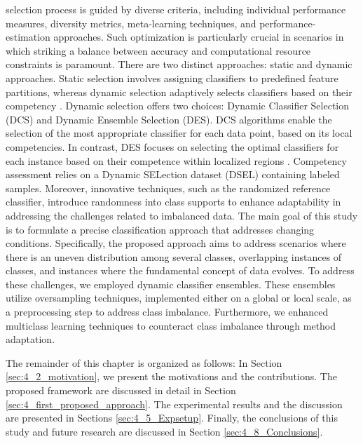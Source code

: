   selection process is guided by diverse criteria, including individual performance measures, diversity metrics, meta-learning techniques,
  and performance-estimation approaches. Such optimization is particularly crucial in scenarios in which striking a balance between
  accuracy and computational resource constraints is paramount. There are two distinct approaches: static and dynamic approaches.
  Static selection involves assigning classifiers to predefined feature partitions, whereas dynamic selection adaptively selects classifiers
  based on their competency \cite{lysiak2014optimal}. Dynamic selection offers two choices: Dynamic Classifier Selection (DCS) and Dynamic Ensemble
  Selection (DES). DCS algorithms enable the selection of the most appropriate classifier for each data point, based on its local competencies. In contrast, DES focuses on selecting the optimal classifiers for each instance based on their competence within localized
  regions \cite{cruz2017meta}\cite{widmer1996learning}\cite{lu2016concept}. Competency assessment relies on a Dynamic SELection dataset (DSEL) containing labeled samples. Moreover,
  innovative techniques, such as the randomized reference classifier, introduce randomness into class supports to enhance adaptability
  in addressing the challenges related to imbalanced data.
  The main goal of this study is to formulate a precise classification approach that addresses changing conditions. Specifically, the
  proposed approach aims to address scenarios where there is an uneven distribution among several classes, overlapping instances of
  classes, and instances where the fundamental concept of data evolves. To address these challenges, we employed dynamic classifier
  ensembles. These ensembles utilize oversampling techniques, implemented either on a global or local scale, as a preprocessing step to
  address class imbalance. Furthermore, we enhanced multiclass learning techniques to counteract class imbalance through method
  adaptation. 
  
  The remainder of this chapter is organized as follows: In Section \ref{sec:4_2_motivation}, we present the motivations and the contributions. The proposed framework are discussed in detail in Section \ref{sec:4_first_proposed_approach}. The  experimental results and the discussion are presented in Sections \ref{sec:4_5_Expsetup}. Finally, the conclusions of this study and future research are discussed in Section \ref{sec:4_8_Conclusions}. 
  
  
